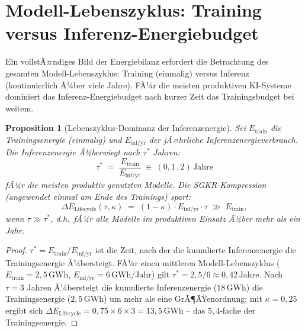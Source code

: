 ﻿\documentclass[12pt, a4paper, openany]{report}
\newtheorem{proposition}[theorem]{Proposition}
\begin{document}
\section{Modell-Lebenszyklus: Training versus Inferenz-Energiebudget}
\label{sec:lifecycle}

Ein vollstÃ¤ndiges Bild der Energiebilanz erfordert die Betrachtung des
gesamten Modell-Lebenszyklus: Training (einmalig) versus Inferenz
(kontinuierlich Ã¼ber viele Jahre).  FÃ¼r die meisten produktiven KI-Systeme
dominiert das Inferenz-Energiebudget nach kurzer Zeit das Trainingsbudget
bei weitem.

\begin{proposition}[Lebenszyklus-Dominanz der Inferenzenergie]
\label{prop:lifecycle}
Sei $E_{\mathrm{train}}$ die Trainingsenergie (einmalig) und
$E_{\mathrm{inf/yr}}$ der jÃ¤hrliche Inferenzenergieverbrauch.
Die Inferenzenergie Ã¼berwiegt nach $\tau^*$ Jahren:
\begin{equation}
  \label{eq:lifecycle}
  \tau^*
  \;=\;
  \frac{E_{\mathrm{train}}}{E_{\mathrm{inf/yr}}}
  \;\in\; (0{,}1\,, 2)\,\mathrm{Jahre}
\end{equation}
fÃ¼r die meisten produktiv genutzten Modelle.  Die SGKR-Kompression
(angewendet einmal am Ende des Trainings) spart:
\begin{equation}
  \label{eq:lifecycle_savings}
  \Delta E_{\mathrm{Lifecycle}}(\tau, \kappa)
  \;=\;
  (1-\kappa) \cdot E_{\mathrm{inf/yr}} \cdot \tau
  \;\gg\; E_{\mathrm{train}},
\end{equation}
wenn $\tau \gg \tau^*$, d.h.\ fÃ¼r alle Modelle im produktiven Einsatz
Ã¼ber mehr als ein Jahr.
\end{proposition}

\begin{proof}
$\tau^* = E_{\mathrm{train}} / E_{\mathrm{inf/yr}}$ ist die Zeit, nach der
die kumulierte Inferenzenergie die Trainingsenergie Ã¼bersteigt.
FÃ¼r einen mittleren Modell-Lebenszyklus ($E_{\mathrm{train}} = 2{,}5\,\mathrm{GWh}$,
$E_{\mathrm{inf/yr}} = 6\,\mathrm{GWh/Jahr}$) gilt
$\tau^* = 2{,}5/6 \approx 0{,}42\,\mathrm{Jahre}$.  Nach $\tau = 3$ Jahren
Ã¼bersteigt die kumulierte Inferenzenergie ($18\,\mathrm{GWh}$) die
Trainingsenergie ($2{,}5\,\mathrm{GWh}$) um mehr als eine GrÃ¶ÃŸenordnung;
mit $\kappa = 0{,}25$ ergibt sich
$\Delta E_{\mathrm{Lifecycle}} = 0{,}75 \times 6 \times 3 = 13{,}5\,\mathrm{GWh}$
-- das $5{,}4$-fache der Trainingsenergie.
\end{proof}
\end{document}
